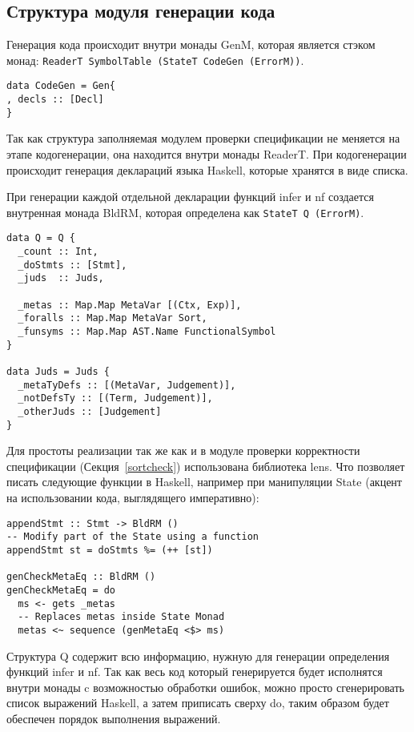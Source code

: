 \subsection{Структура модуля генерации кода}\label{repr}
Генерация кода происходит внутри монады GenM, которая является стэком монад: \lstinline{ReaderT SymbolTable (StateT CodeGen (ErrorM))}.

\begin{lstlisting}[caption={Структура используемая при кодогенерации},captionpos=b,frame=single]
data CodeGen = Gen{
, decls :: [Decl]
}
\end{lstlisting}

Так как структура заполняемая модулем проверки спецификации не меняется на этапе кодогенерации, она находится внутри монады ReaderT. При кодогенерации происходит генерация деклараций языка Haskell, которые хранятся в виде списка.

При генерации каждой отдельной декларации функций infer и nf создается внутренная монада BldRM, которая определена как \lstinline{StateT Q (ErrorM)}.

\begin{lstlisting}[caption={Структура используемая при кодогенерации функции infer},captionpos=b,frame=single]
data Q = Q {
  _count :: Int,
  _doStmts :: [Stmt],
  _juds  :: Juds,

  _metas :: Map.Map MetaVar [(Ctx, Exp)],
  _foralls :: Map.Map MetaVar Sort,
  _funsyms :: Map.Map AST.Name FunctionalSymbol
}

data Juds = Juds {
  _metaTyDefs :: [(MetaVar, Judgement)],
  _notDefsTy :: [(Term, Judgement)],
  _otherJuds :: [Judgement]
}
\end{lstlisting}

Для простоты реализации так же как и в модуле проверки корректности спецификации (Секция~\ref{sortcheck}) использована библиотека lens\cite{lens}. Что позволяет писать следующие функции в Haskell, например при манипуляции State (акцент на использовании кода, выглядящего императивно):

\begin{lstlisting}[frame=single]
appendStmt :: Stmt -> BldRM ()
-- Modify part of the State using a function
appendStmt st = doStmts %= (++ [st])

genCheckMetaEq :: BldRM ()
genCheckMetaEq = do
  ms <- gets _metas
  -- Replaces metas inside State Monad
  metas <~ sequence (genMetaEq <$> ms)
\end{lstlisting}

Структура Q содержит всю информацию, нужную для генерации определения функций infer и nf. Так как весь код который генерируется будет исполнятся внутри монады c возможностью обработки ошибок, можно просто сгенерировать список выражений Haskell, а затем приписать сверху do, таким образом будет обеспечен порядок выполнения выражений.

